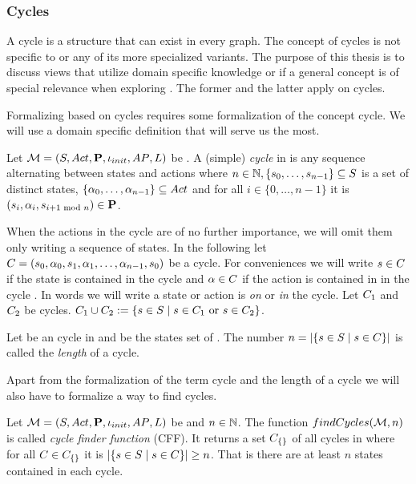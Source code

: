\documentclass[preview]{standalone}
\begin{document}
\subsubsection{Cycles}
A cycle is a structure that can exist in every graph. The concept of cycles is not specific to \chgphsN or any of its more specialized variants. The purpose of this thesis is to discuss views that utilize domain specific knowledge or if a general concept is of special relevance when exploring \achgphN. The former and the latter apply on cycles.

Formalizing \viewsN based on cycles requires some formalization of the concept cycle. We will use a domain specific definition that will serve us the most.

\begin{definition}
	Let ${{{\mathcal{M}}}} = {{({S}, {Act}, {\textbf{P}}, {\iota_{init}}, {AP}, {L})}}$ be \achgphN. A (simple) \emph{cycle} in \chgph is any sequence \cyclesecfull alternating between states and actions where $n \in {\mathbb{N}}, \{{s}_0, \dots, {s}_{n-1}\} \subseteq {S}$ is a set of distinct states,  $\{{\alpha}_0, \dots, {\alpha}_{n-1}\} \subseteq {Act}$ and for all $i \in \{0, \dots, n-1\}$ it is $({s}_i,{\alpha}_i, {s}_{i+1 \text{ mod }n}) \in {\ensuremath{{\textbf{P}}}}$.
\end{definition}

When the actions in the cycle are of no further importance, we will omit them only writing a sequence of states. In the following let ${C} = {({s}_0, {\alpha}_0, {s}_1, {\alpha}_1, \dots, {\alpha}_{n-1}, {s}_0)}$ be a cycle. For conveniences we will write ${s} \in {C}$ if the state is contained in the cycle \cycle and ${\alpha} \in {C}$ if the action is contained in in the cycle \cycle.  In words we will write a state or action is \emph{on} or \emph{in} the cycle. Let ${C}_1$ and ${C}_2$ be cycles. ${C}_1 \cup {C}_2 := \{{s} \in {S} \mid {s} \in {C}_1 \text{ or } {s} \in {C}_2\}$.

\begin{definition}
	Let \cycle be an cycle in \chgph and \states be the states set of \chgph. The number $n = |\{{s} \in {S} \mid {s} \in {C}\}|$ is called the \emph{length} of a cycle. 
\end{definition}

Apart from the formalization of the term cycle and the length of a cycle we will also have to formalize a way to find cycles.

\begin{definition}
	Let ${{{\mathcal{M}}}} = {{({S}, {Act}, {\textbf{P}}, {\iota_{init}}, {AP}, {L})}}$ be \achgphN and $n \in {\mathbb{N}}$. The function  ${findCycles}({{{\mathcal{M}}}}, n)$ is called \emph{cycle finder function} (CFF). It returns a set ${{C}_{\{\}}}$ of all cycles in \chgph where for all $\cycle \in \cycleset$ it is $|\{{s} \in {S} \mid {s} \in {C}\}| \geq n$. That is there are at least $n$ states contained in each cycle. 
\end{definition}
\end{document}
